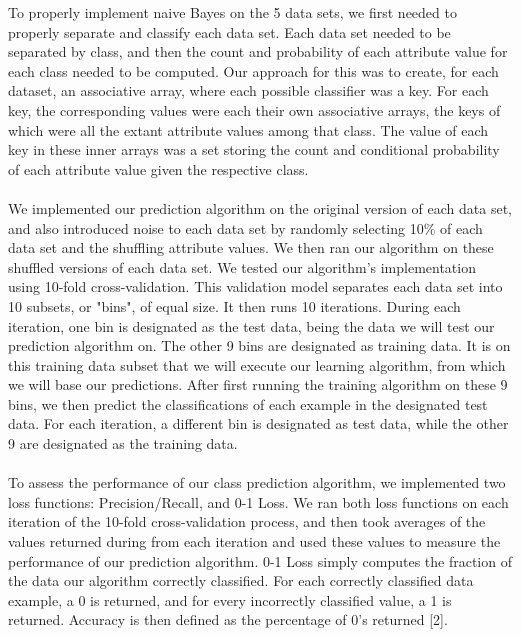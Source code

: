 \documentclass[twoside,11pt]{article}
\begin{document}
To properly implement naive Bayes on the 5 data sets, we first needed to properly separate and classify each data set. Each data set needed to be separated by class, and then the count and probability of each attribute value for each class needed to be computed. Our approach for this was to create, for each dataset, an associative array, where each possible classifier was a key. For each key, the corresponding values were each their own associative arrays, the keys of which were all the extant attribute values among that class. The value of each key in these inner arrays was a set storing the count and conditional probability of each attribute value given the respective class. \\ \\
We implemented our prediction algorithm on the original version of each data set, and also introduced noise to each data set by randomly selecting 10\% of each data set and the shuffling attribute values. We then ran our algorithm on these shuffled versions of each data set.
We tested our algorithm's implementation using 10-fold cross-validation. This validation model separates each data set into 10 subsets, or "bins", of equal size. It then runs 10 iterations. During each iteration, one bin is designated as the test data, being the data we will test our prediction algorithm on. The other 9 bins are designated as training data. It is on this training data subset that we will execute our learning algorithm, from which we will base our predictions. After first running the training algorithm on these 9 bins, we then predict the classifications of each example in the designated test data. For each iteration, a different bin is designated as test data, while the other 9 are designated as the training data. \\ \\
To assess the performance of our class prediction algorithm, we implemented two loss functions: Precision/Recall, and 0-1 Loss. We ran both loss functions on each iteration of the 10-fold cross-validation process, and then took averages of the values returned during from each iteration and used these values to measure the performance of our prediction algorithm. 0-1 Loss simply computes the fraction of the data our algorithm correctly classified. For each correctly classified data example, a 0 is returned, and for every incorrectly classified value, a 1 is returned. Accuracy is then defined as the percentage of 0's returned [2].\\ \\
\end{document}
